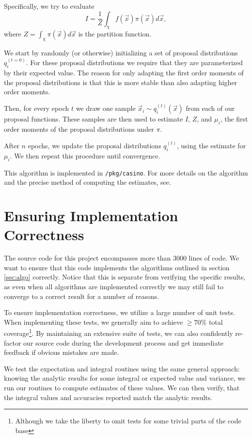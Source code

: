 \documentclass[10pt, a4paper]{article}
\begin{document}
  Specifically, we try to evaluate
  \begin{equation}
  I = \frac{1}{Z} \int_\chi f(\vec{x}) \pi(\vec{x}) d\vec{x},
  \end{equation}
  where $Z = \int_\chi \pi(\vec{x}) d\vec{x}$ is the partition function.

  We start by randomly (or otherwise) initializing a set of proposal distributions $q_i^{(t=0)}$.
  For these proposal distributions we require that they are parameterized by their expected value\cite{apis}.
  The reason for only adapting the first order moments of the proposal distributions is that this is
  more stable than also adapting higher order moments\cite{apis}.

  Then, for every epoch $t$ we draw one sample $\vec{x}_i \sim q_i^{(t)}(\vec{x})$ from each
  of our proposal functions. These samples are then used to estimate $I$, $Z$, and $\mu_i$, the first
  order moments of the proposal distributions under $\pi$.

  After $n$ epochs, we update the proposal distributions $q_i^{(t)}$, using the estimate for $\mu_i$.
  We then repeat this procedure until convergence.

  This algorithm is implemented in \texttt{/pkg/casino}. For more details on the algorithm and the
  precise method of computing the estimates, see\cite{apis}.

\section{Ensuring Implementation Correctness}
  The source code for this project encompasses more than $3000$ lines of code. We want to ensure that
  this code implements the algorithms outlined in section \ref{sec:algo} correctly. Notice that this is separate
  from verifying the specific results, as even when all algorithms are implemented correctly we may
  still fail to converge to a correct result for a number of reasons\cite{nr}.

  To ensure implementation correctness, we utilize a large number of unit tests. When implementing these
  tests, we generally aim to achieve $\ge 70\%$ total coverage\footnote{Although we take the liberty
  to omit tests for some trivial parts of the code base}. By maintaining an extensive suite of tests,
  we can also confidently re-factor our source code during the development process and get immediate
  feedback if obvious mistakes are made.

  We test the expectation and integral routines using the same general approach: knowing the analytic
  results for some integral or expected value and variance, we run our routines to compute estimates
  of these values. We can then verify, that the integral values and accuracies reported match the
  analytic results.
\end{document}
